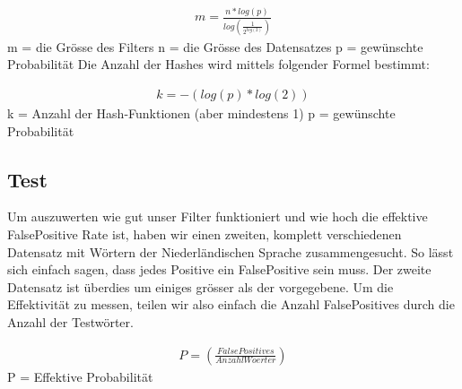 \documentclass[11pt]{article}
\begin{document}
     \begin{align*}
        m = \frac{n * log(p)}{log(\frac{1}{2^{log(2)}})}
    \end{align*}
    \newline
    m = die Gr{\"o}sse des Filters
    \newline
    n = die Gr{\"o}sse des Datensatzes
    \newline
    p = gew{\"u}nschte Probabilit{\"a}t
    \medskip
    \newline
    Die Anzahl der Hashes wird mittels folgender Formel bestimmt:

    \begin{align*}
        k = -(log(p) * log(2))
    \end{align*}
    \newline
    k = Anzahl der Hash-Funktionen (aber mindestens 1)
    \newline
    p = gew{\"u}nschte Probabilit{\"a}t
    \medskip

    \subsection{Test}
    Um auszuwerten wie gut unser Filter funktioniert und wie hoch die effektive FalsePositive Rate ist,
    haben wir einen zweiten, komplett verschiedenen Datensatz mit W{\"o}rtern der Niederl{\"a}ndischen Sprache zusammengesucht.
    So l{\"a}sst sich einfach sagen, dass jedes Positive ein FalsePositive sein muss.
    Der zweite Datensatz ist {\"u}berdies um einiges gr{\"o}sser als der vorgegebene.
    Um die Effektivit{\"a}t zu messen, teilen wir also einfach die Anzahl FalsePositives durch die Anzahl der Testw{\"o}rter.

    \begin{align*}
    P = (\frac{False Positives}{Anzahl Woerter})
    \end{align*}
    \newline
    P = Effektive Probabilit{\"a}t
\end{document}
